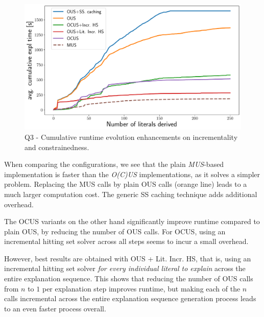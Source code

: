 \begin{figure}[t]
	\centering
	\includegraphics[width=\columnwidth]{figures_post_paper/cumul_incr_avg_time_lits_derived.pdf}
	\caption{Q3 - Cumulative runtime evolution enhancements on incrementality and constrainedness.}
	\label{fig:incrementality_constraindness}
\end{figure}

When comparing the configurations, we see that the plain \emph{MUS}-based implementation is faster than the \emph{O(C)US} implementations, as it solves a simpler problem. %
Replacing the MUS calls by plain OUS calls (orange line) leads to a much larger computation cost. The generic SS caching technique adds additional overhead. 

The OCUS variants on the other hand significantly improve runtime compared to plain OUS, by reducing the number of OUS calls. For OCUS, using an incremental hitting set solver across all steps seems to incur a small overhead.

However, best results are obtained with OUS + Lit. Incr. HS, that is, using an incremental hitting set solver \textit{for every individual literal to explain} across the entire explanation sequence. This shows that reducing the number of OUS calls from $n$ to $1$ per explanation step improves runtime, but making each of the $n$ calls incremental across the entire explanation sequence generation process leads to an even faster process overall.



